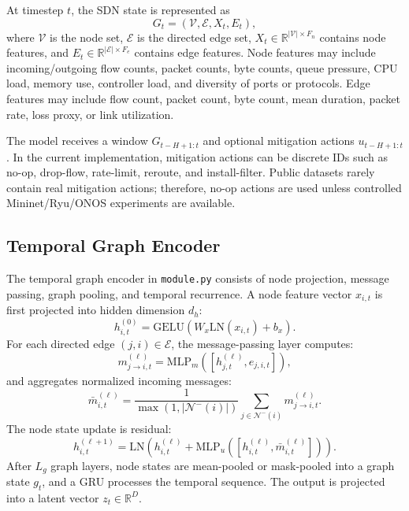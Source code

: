 \documentclass[runningheads]{llncs}
\begin{document}
At timestep $t$, the SDN state is represented as
\begin{equation}
G_t = (\mathcal{V}, \mathcal{E}, X_t, E_t),
\end{equation}
where $\mathcal{V}$ is the node set, $\mathcal{E}$ is the directed edge set,
$X_t \in \mathbb{R}^{|\mathcal{V}|\times F_n}$ contains node features, and
$E_t \in \mathbb{R}^{|\mathcal{E}|\times F_e}$ contains edge features. Node
features may include incoming/outgoing flow counts, packet counts, byte counts,
queue pressure, CPU load, memory use, controller load, and diversity of ports
or protocols. Edge features may include flow count, packet count, byte count,
mean duration, packet rate, loss proxy, or link utilization.

The model receives a window $G_{t-H+1:t}$ and optional mitigation actions
$u_{t-H+1:t}$. In the current implementation, mitigation actions can be
discrete IDs such as no-op, drop-flow, rate-limit, reroute, and install-filter.
Public datasets rarely contain real mitigation actions; therefore, no-op
actions are used unless controlled Mininet/Ryu/ONOS experiments are available.

\subsection{Temporal Graph Encoder}

The temporal graph encoder in \texttt{module.py} consists of node projection,
message passing, graph pooling, and temporal recurrence. A node feature vector
$x_{i,t}$ is first projected into hidden dimension $d_h$:
\begin{equation}
h_{i,t}^{(0)} = \mathrm{GELU}(W_x \mathrm{LN}(x_{i,t}) + b_x).
\end{equation}
For each directed edge $(j,i)\in \mathcal{E}$, the message-passing layer
computes:
\begin{equation}
m_{j\rightarrow i,t}^{(\ell)} =
\mathrm{MLP}_m([h_{j,t}^{(\ell)}, e_{j,i,t}]),
\end{equation}
and aggregates normalized incoming messages:
\begin{equation}
\bar{m}_{i,t}^{(\ell)} =
\frac{1}{\max(1, |\mathcal{N}^-(i)|)}
\sum_{j\in \mathcal{N}^-(i)} m_{j\rightarrow i,t}^{(\ell)}.
\end{equation}
The node state update is residual:
\begin{equation}
h_{i,t}^{(\ell+1)} =
\mathrm{LN}\left(h_{i,t}^{(\ell)} +
\mathrm{MLP}_u([h_{i,t}^{(\ell)}, \bar{m}_{i,t}^{(\ell)}])\right).
\end{equation}
After $L_g$ graph layers, node states are mean-pooled or mask-pooled into a
graph state $g_t$, and a GRU processes the temporal sequence. The output is
projected into a latent vector $z_t \in \mathbb{R}^D$.
\end{document}
